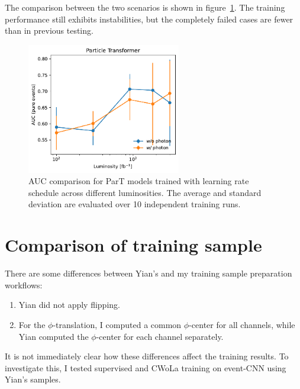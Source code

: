 \documentclass[12pt]{article}
\begin{document}
        The comparison between the two scenarios is shown in figure~\ref{fig:ParT_AUC_various_L_pTnorm_lr_schedule}. The training performance still exhibits instabilities, but the completely failed cases are fewer than in previous testing.
        \begin{figure}[htpb]
            \centering
            \includegraphics[width=0.60\textwidth]{ParT_AUC-true_L-pTnorm_lr_schedule.pdf}
            \caption{AUC comparison for ParT models trained with learning rate schedule across different luminosities. The average and standard deviation are evaluated over 10 independent training runs.}
            \label{fig:ParT_AUC_various_L_pTnorm_lr_schedule}
        \end{figure}

\section{Comparison of training sample}%
\label{sec:comparison_of_training_sample}
    There are some differences between Yian's and my training sample preparation workflows:
    \begin{enumerate}
        \item Yian did not apply flipping.
        \item For the $\phi$-translation, I computed a common $\phi$-center for all channels, while Yian computed the $\phi$-center for each channel separately.
    \end{enumerate}
    It is not immediately clear how these differences affect the training results. To investigate this, I tested supervised and CWoLa training on event-CNN using Yian's samples.
\end{document}
